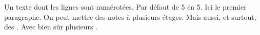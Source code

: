 \renewcommand*{\thefootnoteB}{\roman{footnoteB}}
\beginnumbering
\pstart
Un texte dont les lignes sont numérotées.
Par défaut de 5 en 5.
Ici le premier paragraphe.
On peut mettre des notes à plusieurs étages.
Mais aussi, et surtout, des
.
Avec bien sûr plusieurs .
\pend
\endnumbering
